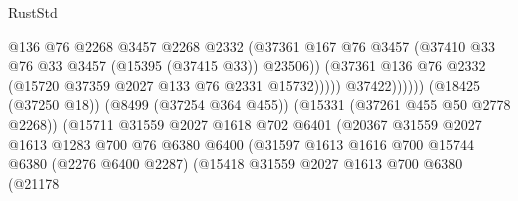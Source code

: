 \begin{lexlean}{RustStd}
\begin{coremodule}
                                              @136
                                              @76
                                              @2268
                                              @3457
                                              @2268
                                              @2332
                                              (@37361
                                                @167
                                                @76
                                                @3457
                                                (@37410
                                                  @33
                                                  @76
                                                  @33
                                                  @3457
                                                  (@15395 (@37415 @33))
                                                  @23506))
                                              (@37361
                                                @136
                                                @76
                                                @2332
                                                (@15720 @37359 @2027 @133 @76 @2331 @15732)))))
                                        @37422))))))
                            (@18425 (@37250 @18))
                            (@8499 (@37254 @364 @455))
                            (@15331 (@37261 @455 @50 @2778 @2268))
                            (@15711
                              @31559
                              @2027
                              @1618
                              @702
                              @6401
                              (@20367
                                @31559
                                @2027
                                @1613
                                @1283
                                @700
                                @76
                                @6380
                                @6400
                                (@31597
                                  @1613
                                  @1616
                                  @700
                                  @15744
                                  @6380
                                  (@2276 @6400 @2287)
                                  (@15418
                                    @31559
                                    @2027
                                    @1613
                                    @700
                                    @6380
                                    (@21178

\end{coremodule}
\end{lexlean}
